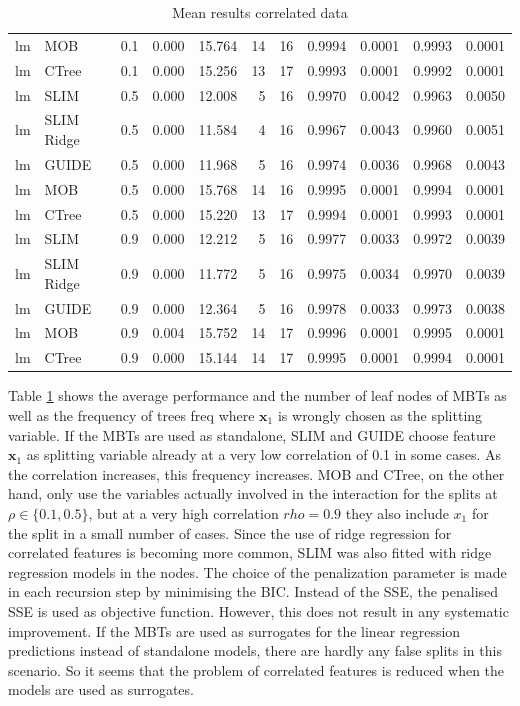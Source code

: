 \begin{table}[!htb]
\begin{tabular}[t]{l|l|r|r|r|r|r|r|r|r|r}
lm & MOB & 0.1 & 0.000 & 15.764 & 14 & 16 & 0.9994 & 0.0001 & 0.9993 & 0.0001\\
lm & CTree & 0.1 & 0.000 & 15.256 & 13 & 17 & 0.9993 & 0.0001 & 0.9992 & 0.0001\\
\hline
lm & SLIM & 0.5 & 0.000 & 12.008 & 5 & 16 & 0.9970 & 0.0042 & 0.9963 & 0.0050\\
lm & SLIM Ridge & 0.5 & 0.000 & 11.584 & 4 & 16 & 0.9967 & 0.0043 & 0.9960 & 0.0051\\
lm & GUIDE & 0.5 & 0.000 & 11.968 & 5 & 16 & 0.9974 & 0.0036 & 0.9968 & 0.0043\\
lm & MOB & 0.5 & 0.000 & 15.768 & 14 & 16 & 0.9995 & 0.0001 & 0.9994 & 0.0001\\
lm & CTree & 0.5 & 0.000 & 15.220 & 13 & 17 & 0.9994 & 0.0001 & 0.9993 & 0.0001\\
\hline
lm & SLIM & 0.9 & 0.000 & 12.212 & 5 & 16 & 0.9977 & 0.0033 & 0.9972 & 0.0039\\
lm & SLIM Ridge & 0.9 & 0.000 & 11.772 & 5 & 16 & 0.9975 & 0.0034 & 0.9970 & 0.0039\\
lm & GUIDE & 0.9 & 0.000 & 12.364 & 5 & 16 & 0.9978 & 0.0033 & 0.9973 & 0.0038\\
lm & MOB & 0.9 & 0.004 & 15.752 & 14 & 17 & 0.9996 & 0.0001 & 0.9995 & 0.0001\\
lm & CTree & 0.9 & 0.000 & 15.144 & 14 & 17 & 0.9995 & 0.0001 & 0.9994 & 0.0001\\
\hline
\end{tabular}
\caption{Mean results correlated data}
\label{tab:linear_smooth_correlated_summary}
\end{table} 


Table \ref{tab:linear_smooth_correlated_summary} shows the average performance and the number of leaf nodes of MBTs  as well as the frequency of trees freq where $\textbf{x}_1$ is wrongly chosen as the splitting variable.
If the MBTs are used as standalone, SLIM and GUIDE choose feature $\textbf{x}_1$ as splitting variable already at a very low correlation of 0.1 in some cases. As the correlation increases, this frequency increases. MOB and CTree, on the other hand, only use the variables actually involved in the interaction for the splits at $\rho \in \{0.1, 0.5\}$, but at a very high correlation $rho = 0.9$ they also include $x_1$ for the split in a small number of cases. 
Since the use of ridge regression for correlated features is becoming more common, SLIM was also fitted with ridge regression models in the nodes. The choice of the penalization parameter is made in each recursion step by minimising the BIC. Instead of the SSE, the penalised SSE is used as objective function. However, this does not result in any systematic improvement. 
If the MBTs are used as surrogates for the linear regression predictions instead of standalone models, there are hardly any false splits in this scenario. So it seems that the problem of correlated features is reduced when the models are used as surrogates.


